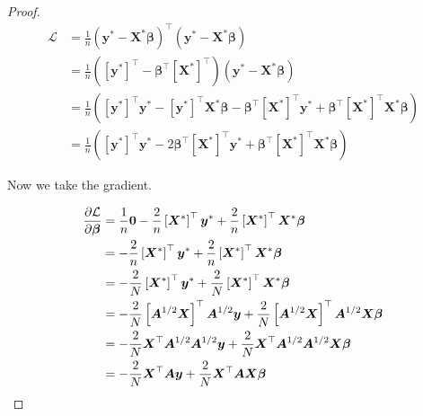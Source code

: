 \begin{proof}
\begin{align*}
\mathcal{L}  & =\frac{1}{n} \left({\boldsymbol{y}}^* - {\boldsymbol{X}}^*\boldsymbol{\beta}\right)^\top \left({\boldsymbol{y}}^*- {\boldsymbol{X}}^*\boldsymbol{\beta}\right)
\\ & =\frac{1}{n} \left(\left[\boldsymbol{y}^*\right]^\top- \boldsymbol{\beta}^\top \left[\boldsymbol{X}^*\right]^\top\right) \left({\boldsymbol{y}}^*- {\boldsymbol{X}}^*\boldsymbol{\beta}\right)
\\ & =\frac{1}{n} \left(
\left[\boldsymbol{y}^*\right]^\top {\boldsymbol{y}}^*
- \left[\boldsymbol{y}^*\right]^\top{\boldsymbol{X}}^*\boldsymbol{\beta}
- \boldsymbol{\beta}^\top \left[\boldsymbol{X}^*\right]^\top {\boldsymbol{y}}^*
+ \boldsymbol{\beta}^\top \left[\boldsymbol{X}^*\right]^\top{\boldsymbol{X}}^*\boldsymbol{\beta}
 \right)
 \\ & =\frac{1}{n} \left(
\left[\boldsymbol{y}^*\right]^\top {\boldsymbol{y}}^*
- 2\boldsymbol{\beta}^\top \left[\boldsymbol{X}^*\right]^\top {\boldsymbol{y}}^*
+ \boldsymbol{\beta}^\top \left[\boldsymbol{X}^*\right]^\top{\boldsymbol{X}}^*\boldsymbol{\beta}
 \right)
\end{align*}

Now we take the gradient.

\begin{align*}
\pderiv{\mathcal{L}}{\boldsymbol{\beta}} & =  
\frac{1}{n}\boldsymbol{0}
- \frac{2}{n}\left[\boldsymbol{X}^*\right]^\top {\boldsymbol{y}}^*
+ \frac{2}{n} \left[\boldsymbol{X}^*\right]^\top{\boldsymbol{X}}^*\boldsymbol{\beta}
\\ & =  
- \frac{2}{n}\left[\boldsymbol{X}^*\right]^\top {\boldsymbol{y}}^*
+ \frac{2}{n} \left[\boldsymbol{X}^*\right]^\top{\boldsymbol{X}}^*\boldsymbol{\beta}
\\ & =  
-  \frac{2}{N} \left[\boldsymbol{X}^*\right]^\top {\boldsymbol{y}}^*
+ \frac{2}{N} \left[\boldsymbol{X}^*\right]^\top {\boldsymbol{X}}^*\boldsymbol{\beta}
%
\\ & =  
-  \frac{2}{N} \left[\boldsymbol{A}^{1/2} \boldsymbol{X} \right]^\top  \boldsymbol{A}^{1/2} \boldsymbol{y}
+ \frac{2}{N} \left[\boldsymbol{A}^{1/2} \boldsymbol{X}  \right]^\top \boldsymbol{A}^{1/2} \boldsymbol{X} \boldsymbol{\beta}
%
\\ & =  
-  \frac{2}{N} \boldsymbol{X}^\top \boldsymbol{A}^{1/2} \boldsymbol{A}^{1/2} \boldsymbol{y}
+ \frac{2}{N}\boldsymbol{X}^\top \boldsymbol{A}^{1/2} \boldsymbol{A}^{1/2} \boldsymbol{X} \boldsymbol{\beta}
%
\\ & =  
-  \frac{2}{N} \boldsymbol{X}^\top \boldsymbol{A} \boldsymbol{y}
+ \frac{2}{N}\boldsymbol{X}^\top \boldsymbol{A} \boldsymbol{X} \boldsymbol{\beta}
\end{align*}


\end{proof}

